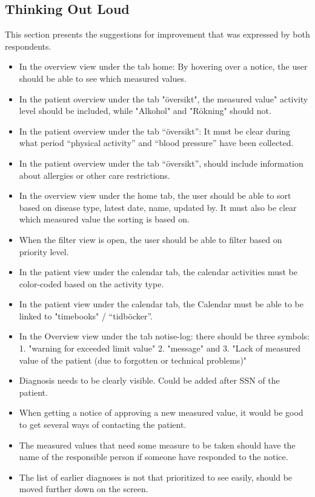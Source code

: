 \documentclass{article}
\begin{document}
	\subsection{Thinking Out Loud}
	This section presents the suggestions for improvement that was expressed by both respondents.
	
	\begin{itemize}
		\item In the overview view under the tab home: By hovering over a notice, the user should be able to see which measured values. 
		
		\item In the patient overview under the tab "översikt", the measured value" activity level should be included, while "Alkohol" and "Rökning" should not.
		
		\item In the patient overview under the tab “översikt”: It must be clear during what period “physical activity” and “blood pressure” have been collected. 
		
		\item In the patient overview under the tab “översikt”, should include information about allergies or other care restrictions. 
		
		\item In the overview view under the home tab, the user should be able to sort based on disease type, latest date, name, updated by. It must also be clear which measured value the sorting is based on. 
		
		\item When the filter view is open, the user should be able to filter based on priority level. 
		
		\item In the patient view under the calendar tab, the calendar activities must be color-coded based on the activity type. 
		
		\item In the patient view under the calendar tab, the Calendar must be able to be linked to "timebooks" / “tidböcker”. 
		
		\item In the Overview view under the tab notise-log: there should be three symbols: 1. "warning for exceeded limit value" 2. "message" and 3. "Lack of measured value of the patient (due to forgotten or technical problems)" 

		\item Diagnosis needs to be clearly visible. Could be added after SSN of the patient.
		\item When getting a notice of approving a new measured value, it would be good to get several ways of contacting the patient.
		
		\item The measured values that need some measure to be taken should have the name of the responsible person if someone have responded to the notice.
		
		\item The list of earlier diagnoses is not that prioritized to see easily, should be moved further down on the screen.
	\end{itemize}
	
\end{document}
